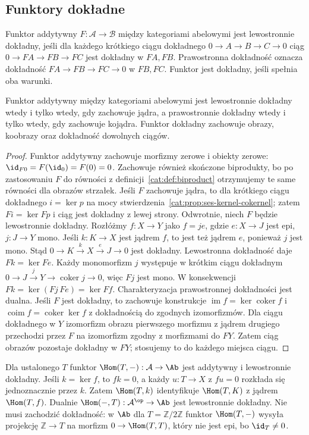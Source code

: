 \subsection{Funktory dokładne}
\begin{definicja}\label{cat:def:exact-functor}
Funktor addytywny $F:\mathcal A\to\mathcal B$ między kategoriami abelowymi jest lewostronnie dokładny, jeśli dla każdego krótkiego ciągu dokładnego $0\to A\to B\to C\to0$ ciąg $0\to FA\to FB\to FC$ jest dokładny w $FA,FB$. Prawostronna dokładność oznacza dokładność $FA\to FB\to FC\to0$ w $FB,FC$. Funktor jest dokładny, jeśli spełnia oba warunki.
\end{definicja}
\begin{twierdzenie}\label{cat:thm:exact-functor-kernels}
Funktor addytywny między kategoriami abelowymi jest lewostronnie dokładny wtedy i tylko wtedy, gdy zachowuje jądra, a prawostronnie dokładny wtedy i tylko wtedy, gdy zachowuje kojądra. Funktor dokładny zachowuje obrazy, koobrazy oraz dokładność dowolnych ciągów.
\end{twierdzenie}
\begin{proof}
Funktor addytywny zachowuje morfizmy zerowe i obiekty zerowe: $\id_{F0}=F(\id_0)=F(0)=0$. Zachowuje również skończone biprodukty, bo po zastosowaniu $F$ do równości z definicji~\ref{cat:def:biproduct} otrzymujemy te same równości dla obrazów strzałek.
Jeśli $F$ zachowuje jądra, to dla krótkiego ciągu dokładnego $i=\ker p$ na mocy stwierdzenia~\ref{cat:prop:ses-kernel-cokernel}; zatem $Fi=\ker Fp$ i ciąg jest dokładny z lewej strony.
Odwrotnie, niech $F$ będzie lewostronnie dokładny. Rozłóżmy $f:X\to Y$ jako $f=je$, gdzie $e:X\to J$ jest epi, $j:J\to Y$ mono. Jeśli $k:K\to X$ jest jądrem $f$, to jest też jądrem $e$, ponieważ $j$ jest mono. Stąd $0\to K\xrightarrow{k}X\xrightarrow{e}J\to0$ jest dokładny. Lewostronna dokładność daje $Fk=\ker Fe$. Każdy monomorfizm $j$ występuje w krótkim ciągu dokładnym $0\to J\xrightarrow{j}Y\to\operatorname{coker}j\to0$, więc $Fj$ jest mono. W konsekwencji $Fk=\ker(Fj\,Fe)=\ker Ff$. Charakteryzacja prawostronnej dokładności jest dualna.
Jeśli $F$ jest dokładny, to zachowuje konstrukcje $\operatorname{im}f=\ker\operatorname{coker}f$ i $\operatorname{coim}f=\operatorname{coker}\ker f$ z dokładnością do zgodnych izomorfizmów. Dla ciągu dokładnego w $Y$ izomorfizm obrazu pierwszego morfizmu z jądrem drugiego przechodzi przez $F$ na izomorfizm zgodny z morfizmami do $FY$. Zatem ciąg obrazów pozostaje dokładny w $FY$; stosujemy to do każdego miejsca ciągu.
\end{proof}
\begin{przyklad}\label{cat:ex:hom-left-exact}
Dla ustalonego $T$ funktor $\Hom(T,-):\mathcal A\to\Ab$ jest addytywny i lewostronnie dokładny. Jeśli $k=\ker f$, to $fk=0$, a każdy $u:T\to X$ z $fu=0$ rozkłada się jednoznacznie przez $k$. Zatem $\Hom(T,k)$ identyfikuje $\Hom(T,K)$ z jądrem $\Hom(T,f)$. Dualnie $\Hom(-,T):\mathcal A^{\op}\to\Ab$ jest lewostronnie dokładny. Nie musi zachodzić dokładność: w $\Ab$ dla $T=\mathbb Z/2\mathbb Z$ funktor $\Hom(T,-)$ wysyła projekcję $\mathbb Z\to T$ na morfizm $0\to\Hom(T,T)$, który nie jest epi, bo $\id_T\ne0$.
\end{przyklad}

